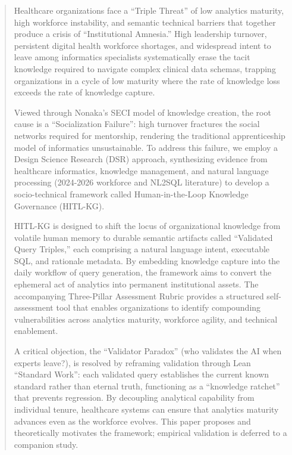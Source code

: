 \documentclass[
  american,
  11pt,
  letterpaper,
  oneside  ,captions=tableheading
]{scrartcl}
\begin{document}
\begin{abstract}
Healthcare organizations face a ``Triple Threat'' of low analytics
maturity, high workforce instability, and semantic technical barriers
that together produce a crisis of ``Institutional Amnesia.'' High
leadership turnover, persistent digital health workforce shortages, and
widespread intent to leave among informatics specialists systematically
erase the tacit knowledge required to navigate complex clinical data
schemas, trapping organizations in a cycle of low maturity where the
rate of knowledge loss exceeds the rate of knowledge capture.

Viewed through Nonaka's SECI model of knowledge creation, the root cause
is a ``Socialization Failure'': high turnover fractures the social
networks required for mentorship, rendering the traditional
apprenticeship model of informatics unsustainable. To address this
failure, we employ a Design Science Research (DSR) approach,
synthesizing evidence from healthcare informatics, knowledge management,
and natural language processing (2024-2026 workforce and NL2SQL
literature) to develop a socio-technical framework called
Human-in-the-Loop Knowledge Governance (HITL-KG).

HITL-KG is designed to shift the locus of organizational knowledge from
volatile human memory to durable semantic artifacts called ``Validated
Query Triples,'' each comprising a natural language intent, executable
SQL, and rationale metadata. By embedding knowledge capture into the
daily workflow of query generation, the framework aims to convert the
ephemeral act of analytics into permanent institutional assets. The
accompanying Three-Pillar Assessment Rubric provides a structured
self-assessment tool that enables organizations to identify compounding
vulnerabilities across analytics maturity, workforce agility, and
technical enablement.

A critical objection, the ``Validator Paradox'' (who validates the AI
when experts leave?), is resolved by reframing validation through Lean
``Standard Work'': each validated query establishes the current known
standard rather than eternal truth, functioning as a ``knowledge
ratchet'' that prevents regression. By decoupling analytical capability
from individual tenure, healthcare systems can ensure that analytics
maturity advances even as the workforce evolves. This paper proposes and
theoretically motivates the framework; empirical validation is deferred
to a companion study.
\end{abstract}
\end{document}
